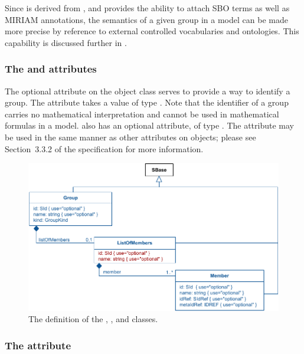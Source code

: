 Since \Group is derived from \SBase, and \SBase provides the ability to attach SBO terms as well as MIRIAM annotations, the semantics of a given group in a model can be made more precise by reference to external controlled vocabularies and ontologies.  This capability is discussed further in .


\subsubsection{The \fixttspace{} and \fixttspace{} attributes}
\label{group-idname-attributes}

The optional  attribute on the \Group object class serves to provide a way to identify a group.  The attribute takes a value of type .  Note that the identifier of a group carries no mathematical interpretation and cannot be used in mathematical formulas in a model.  \Group also has an optional  attribute, of type .  The  attribute may be used in the same manner as other  attributes on \sbmlthreecore objects; please see Section~3.3.2 of the \sbmlthreecore specification for more information.


\begin{figure}[bh]
  \includegraphics{figs/group-uml-v1}
 \caption{The definition of the \Group, \ListOfMembers, and \Member classes.}
  \label{group-uml}
  \label{member-uml}
\end{figure}

\subsubsection{The \fixttspace{} attribute}
\label{kind-attribute}


